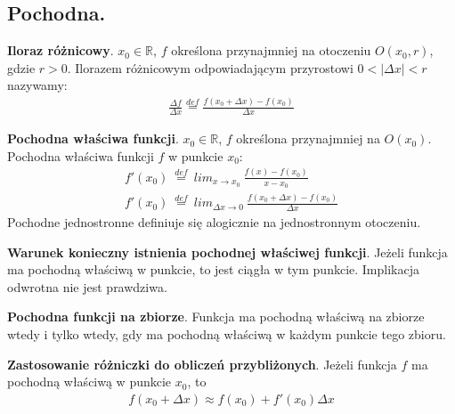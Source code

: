 \documentclass[main.tex]{subfiles}
\begin{document}
    \subsection{Pochodna.}

    \begin{definition}
        \textbf{Iloraz różnicowy}. $x_0 \in \mathbb{R}$, $f$ określona przynajmniej na otoczeniu $O(x_0, r)$,
        gdzie $r > 0$. Ilorazem różnicowym odpowiadającym przyrostowi $0 < |\Delta x| < r$ nazywamy:
        \begin{align*}
            \frac{\Delta f}{\Delta x} \stackrel{def}{=} \frac{f(x_0 + \Delta x) - f(x_0)}{\Delta x}
        \end{align*}
    \end{definition}

    \begin{definition}
        \textbf{Pochodna właściwa funkcji}. $x_0 \in \mathbb{R}$, $f$ określona przynajmniej na $O(x_0)$. Pochodna
        właściwa funkcji $f$ w punkcie $x_0$:
        \begin{gather*}
            f'(x_0) ~ \stackrel{def}{=} ~ lim_{x \rightarrow x_0} ~ \frac{f(x) - f(x_0)}{x - x_0}\\
            f'(x_0) ~ \stackrel{def}{=} ~ lim_{\Delta x \rightarrow 0} ~ \frac{f(x_0 + \Delta x) - f(x_0)}{\Delta x}
        \end{gather*}
        Pochodne jednostronne definiuje się alogicznie na jednostronnym otoczeniu.
    \end{definition}

    \begin{theorem}
        \textbf{Warunek konieczny istnienia pochodnej właściwej funkcji}. Jeżeli funkcja ma pochodną właściwą w punkcie,
        to jest ciągła w tym punkcie. Implikacja odwrotna nie jest prawdziwa.
    \end{theorem}

    \begin{definition}
        \textbf{Pochodna funkcji na zbiorze}. Funkcja ma pochodną właściwą na zbiorze wtedy i tylko wtedy, gdy ma pochodną
        właściwą w każdym punkcie tego zbioru.
    \end{definition}

    \begin{theorem}
        \textbf{Zastosowanie różniczki do obliczeń przybliżonych}. Jeżeli funkcja $f$ ma pochodną właściwą w punkcie
        $x_0$, to
        \begin{align*}
            f(x_0 + \Delta x) \approx f(x_0) + f'(x_0)\Delta x
        \end{align*}
    \end{theorem}
\end{document}
